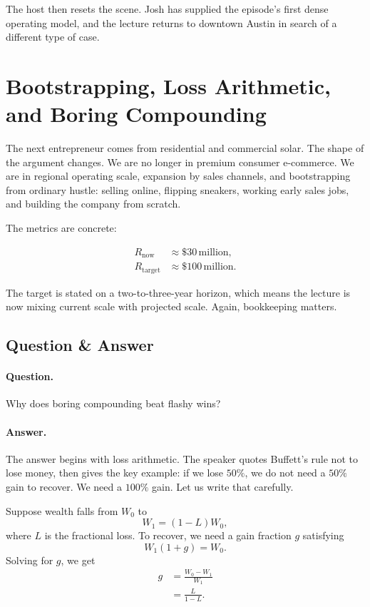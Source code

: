 The host then resets the scene. Josh has supplied the episode's first dense operating model, and the lecture returns to downtown Austin in search of a different type of case.

\section{Bootstrapping, Loss Arithmetic, and Boring Compounding}

The next entrepreneur comes from residential and commercial solar. The shape of the argument changes. We are no longer in premium consumer e-commerce. We are in regional operating scale, expansion by sales channels, and bootstrapping from ordinary hustle: selling online, flipping sneakers, working early sales jobs, and building the company from scratch.

The metrics are concrete:

\begin{align}
R_{\text{now}} &\approx \$30\,\text{million},\\
R_{\text{target}} &\approx \$100\,\text{million}.
\end{align}

The target is stated on a two-to-three-year horizon, which means the lecture is now mixing current scale with projected scale. Again, bookkeeping matters.

\subsection{Question \& Answer}

\paragraph{Question.} Why does boring compounding beat flashy wins?

\paragraph{Answer.} The answer begins with loss arithmetic. The speaker quotes Buffett's rule not to lose money, then gives the key example: if we lose $50\%$, we do not need a $50\%$ gain to recover. We need a $100\%$ gain. Let us write that carefully.

Suppose wealth falls from $W_0$ to
\begin{equation}
W_1 = (1-L)W_0,
\end{equation}
where $L$ is the fractional loss. To recover, we need a gain fraction $g$ satisfying
\begin{equation}
W_1(1+g) = W_0.
\end{equation}
Solving for $g$, we get
\begin{align}
g &= \frac{W_0-W_1}{W_1}\\
  &= \frac{L}{1-L}.
\end{align}

